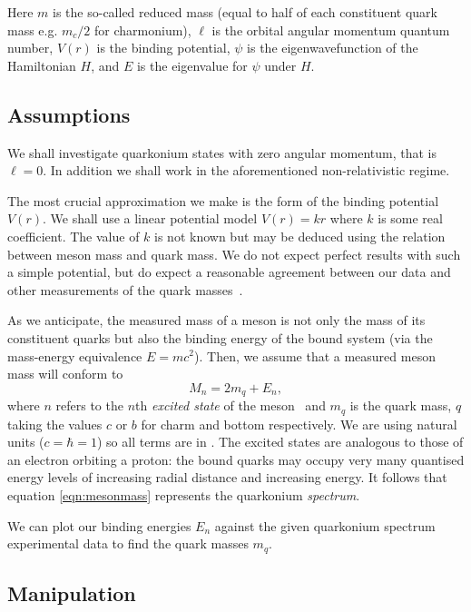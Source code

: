 \documentclass[]{article}
\begin{document}
Here $m$ is the so-called reduced mass (equal to half of each constituent quark mass e.g. $m_{c}/2$ for charmonium), $\ell$ is the orbital angular momentum quantum number, $V(r)$ is the binding potential, $\psi$ is the eigenwavefunction of the Hamiltonian $H$, and $E$ is the eigenvalue for $\psi$ under $H$.

\subsection{Assumptions}\label{ssec:assumptions}

We shall investigate quarkonium states with zero angular momentum, that is $\ell = 0$. In addition we shall work in the aforementioned non-relativistic regime.

The most crucial approximation we make is the form of the binding potential $V(r)$. We shall use a linear potential model $V(r) = kr$ where $k$ is some real coefficient. The value of $k$ is not known but may be deduced using the relation between meson mass and quark mass. We do not expect perfect results with such a simple potential, but do expect a reasonable agreement between our data and other measurements of the quark masses~\cite{ref:pdg}.

As we anticipate, the measured mass of a meson is not only the mass of its constituent quarks but also the binding energy of the bound system (via the mass-energy equivalence $E=mc^{2}$). Then, we assume that a measured meson mass will conform to
\begin{equation}\label{eqn:mesonmass}
M_{n} = 2m_{q} + E_{n},
\end{equation}
where $n$ refers to the $n$th \emph{excited state} of the meson~\cite{ref:buchmuller} and $m_{q}$ is the quark mass, $q$ taking the values $c$ or $b$ for charm and bottom respectively. We are using natural units ($c = \hbar = 1$) so all terms are in \GeV. The excited states are analogous to those of an electron orbiting a proton: the bound quarks may occupy very many quantised energy levels of increasing radial distance and increasing energy. It follows that equation \ref{eqn:mesonmass} represents the quarkonium \emph{spectrum}.

We can plot our binding energies $E_{n}$ against the given quarkonium spectrum experimental data to find the quark masses $m_{q}$.

\subsection{Manipulation}
\end{document}
